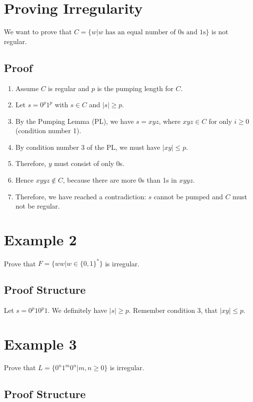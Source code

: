 \documentclass{article}
\begin{document}
\section*{Proving Irregularity}

We want to prove that $C=\{w|\text{$w$ has an equal number of 0s and 1s}\}$ is not regular.

\subsection*{Proof}

\begin{enumerate}
\item Assume $C$ is regular and $p$ is the pumping length for $C$.
\item Let $s=0^p1^p$ with $s\in{}C$ and $|s|\ge{}p$.
\item By the Pumping Lemma (PL), we have $s=xyz$, where $xyz\in{}C$
  for only $i\ge{}0$ (condition number 1).
\item By condition number 3 of the PL, we must have $|xy|\le{}p$.
\item Therefore, $y$ must consist of only 0s.
\item Hence $xyyz\not\in{}C$, because there are more 0s than 1s in $xyyz$.
\item Therefore, we have reached a contradiction: $s$ cannot be pumped
  and $C$ must not be regular.
\end{enumerate}

\section*{Example 2}

Prove that $F=\{ww|w\in\{0,1\}^*\}$ is irregular.

\subsection*{Proof Structure}

Let $s=0^p10^p1$. We definitely have $|s|\ge{}p$. Remember condition
3, that $|xy|\le{}p$.

\section*{Example 3}

Prove that $L=\{0^n1^m0^n|m,n\ge0\}$ is irregular.

\subsection*{Proof Structure}
\end{document}
